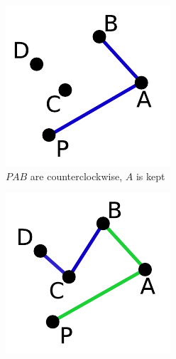 \begin{figure}[h!]
    \centering
    \begin{subfigure}[b]{0.25\textwidth}
        \centering
        \includegraphics[width=0.9\linewidth]{images/graham1}
        \caption{$PAB$ are counterclockwise, $A$ is kept}
    \end{subfigure}%
    \hspace{0.05\textwidth} %
    \begin{subfigure}[b]{0.25\textwidth}
        \centering
        \includegraphics[width=0.9\linewidth]{images/graham2}

\end{subfigure}
\end{figure}
